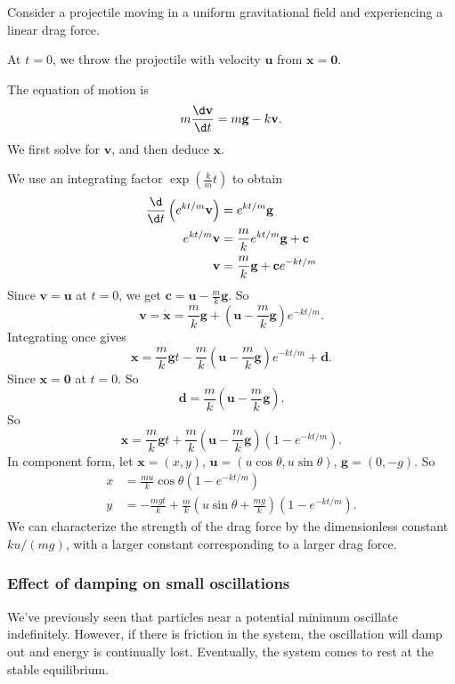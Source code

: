 \documentclass[a4paper]{article}
\begin{document}
\begin{eg}
  Consider a projectile moving in a uniform gravitational field and experiencing a linear drag force.

  At $t = 0$, we throw the projectile with velocity $\mathbf{u}$ from $\mathbf{x} = \mathbf{0}$.

  The equation of motion is
  \[
    m\frac{\d \mathbf{v}}{\d t} = m\mathbf{g} - k\mathbf{v}.
  \]
  We first solve for $\mathbf{v}$, and then deduce $\mathbf{x}$.

  We use an integrating factor $\exp(\frac{k}{m}t)$ to obtain
  \begin{align*}
    \frac{\d }{\d t} \left(e^{kt/m}\mathbf{v}\right) &= e^{kt/m} \mathbf{g}\\
    e^{kt/m} \mathbf{v}&= \frac{m}{k}e^{kt/m}\mathbf{g} + \mathbf{c}\\
    \mathbf{v} &= \frac{m}{k}\mathbf{g} + \mathbf{c} e^{-kt/m}
  \end{align*}
  Since $\mathbf{v} = \mathbf{u}$ at $t = 0$, we get $\mathbf{c} = \mathbf{u} - \frac{m}{k}\mathbf{g}$. So
  \[
    \mathbf{v} = \dot{\mathbf{x}} = \frac{m}{k}\mathbf{g} + \left(\mathbf{u} - \frac{m}{k}\mathbf{g}\right)e^{-kt/m}.
  \]
  Integrating once gives
  \[
    \mathbf{x} = \frac{m}{k}\mathbf{g}t - \frac{m}{k}\left(\mathbf{u} - \frac{m}{k} \mathbf{g}\right) e^{-kt/m} + \mathbf{d}.
  \]
  Since $\mathbf{x} = \mathbf{0}$ at $t = 0$. So
  \[
    \mathbf{d} = \frac{m}{k}\left(\mathbf{u} - \frac{m}{k}\mathbf{g}\right).
  \]
  So
  \[
    \mathbf{x} = \frac{m}{k}\mathbf{g}t + \frac{m}{k}\left (\mathbf{u} - \frac{m}{k}\mathbf{g}\right)(1 - e^{-kt/m}).
  \]
  In component form, let $\mathbf{x} = (x, y)$, $\mathbf{u} = (u\cos \theta, u\sin \theta)$, $\mathbf{g} = (0, -g)$. So
  \begin{align*}
    x &= \frac{mu}{k}\cos \theta (1 - e^{-kt/m})\\
    y &= -\frac{mgt}{k} + \frac{m}{k}\left(u\sin \theta + \frac{mg}{k}\right)(1 - e^{-kt/m}).
  \end{align*}
  We can characterize the strength of the drag force by the dimensionless constant $ku/(mg)$, with a larger constant corresponding to a larger drag force.
\end{eg}
\subsubsection*{Effect of damping on small oscillations}
We've previously seen that particles near a potential minimum oscillate indefinitely. However, if there is friction in the system, the oscillation will damp out and energy is continually lost. Eventually, the system comes to rest at the stable equilibrium.
\end{document}
